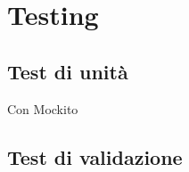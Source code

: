 
\chapter{Testing}
\label{cap:testing}

\section{Test di unità}

Con Mockito 

\section{Test di validazione}


